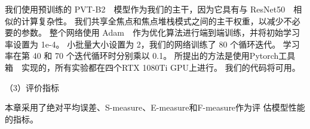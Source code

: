我们使用预训练的 PVT-B2~\cite{wang2022pvt}~模型作为我们的主干，因为它具有与 ResNet50~\cite{he2016deep}~相似的计算复杂性。 我们共享全焦点和焦点堆栈模式之间的主干权重，以减少不必要的参数。 整个网络使用 Adam~\cite{kingma2014adam}~作为优化算法进行端到端训练，并将初始学习率设置为 1e-4。 小批量大小设置为 2，我们的网络训练了 80 个循环迭代。 学习率在第 40 和 70 个迭代循环时分别乘以 0.1。 所提出的方法是使用Pytorch工具箱~\cite{paszke2017automatic}~实现的，所有实验都在四个RTX 1080Ti GPU上进行。 我们的代码将可用。 
%
%
%
%
%
\par
%
%
%
%
%
（3）评价指标
%
%
\par
%
%
本章采用了绝对平均误差、S-measure、E-measure和F-measure作为评
估模型性能的指标。






